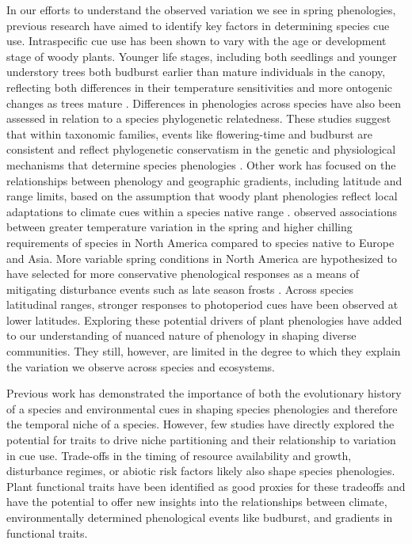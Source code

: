 \documentclass{article}\usepackage[]{graphicx}\usepackage[]{color}
\begin{document}
In our efforts to understand the observed variation we see in spring phenologies, previous research have aimed to identify key factors in determining species cue use. Intraspecific cue use has been shown to vary with the age or development stage of woody plants. Younger life stages, including both seedlings and younger understory trees both budburst earlier than mature individuals in the canopy, reflecting both differences in their temperature sensitivities and more ontogenic changes as trees mature \citep{Vitasse2013, Seiwa1999}. Differences in phenologies across species have also been assessed in relation to a species phylogenetic relatedness. These studies suggest that within taxonomic families, events like flowering-time and budburst are consistent and reflect phylogenetic conservatism in the genetic and physiological mechanisms that determine species phenologies \citep{Kochmer1986, Davies2013}. Other work has focused on the relationships between phenology and geographic gradients, including latitude and range limits, based on the assumption that woody plant phenologies reflect local adaptations to climate cues within a species native range \citep{Lechowicz1984, Chuine2001, Chuine2010}. \citep{Zohner2017} observed associations between greater temperature variation in the spring and higher chilling requirements of species in North America compared to species native to Europe and Asia. More variable spring conditions in North America are hypothesized to have selected for more conservative phenological responses as a means of mitigating disturbance events such as late season frosts \citep{citations}. Across species latitudinal ranges, stronger responses to photoperiod cues have been observed at lower latitudes. Exploring these potential drivers of plant phenologies have added to our understanding of nuanced nature of phenology in shaping diverse communities. They still, however, are limited in the degree to which they explain the variation we observe across species and ecosystems.

Previous work has demonstrated the importance of both the evolutionary history of a species and environmental cues in shaping species phenologies and therefore the temporal niche of a species. However, few studies have directly explored the potential for traits to drive niche partitioning and their relationship to variation in cue use. Trade-offs in the timing of resource availability and growth, disturbance regimes, or abiotic risk factors likely also shape species phenologies. Plant functional traits have been identified as good proxies for these tradeoffs and have the potential to offer new insights into the relationships between climate, environmentally determined phenological events like budburst, and gradients in functional traits.
\end{document}
